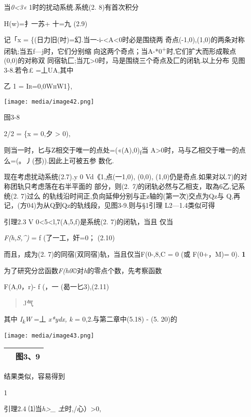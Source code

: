 \documentclass{article}
\begin{document}
当\emph{0\textless{}3«} 1时的扰动系统.系统(2. 8)有首次积分

H(w)=扌一苏+ 十=九 (2.9)

记「x = \{(日力旧(吋)=幻.当一-i-\textless{}A\textless{}0时必是围绕两
奇点(-1,0),(1,0)的两条对称闭轨;当五f---j时，它们分别缩
向这两个奇点；当A-*0\textsuperscript{+}时,它们扩大而形成鞍点(0,0)的对称双
同宿轨匚;当兀\textgreater{}0时，马是围绕三个奇点及匚的闭轨.以上分布
见图3-8.若令£ =丄UA,其中

乙 1 = \textsc{Ir=0,0WhW1\},}

\texttt{[image: media/image42.png]}

囹3-8

2/2 = \{\textbar{}x = 0,夕 \textgreater{} 0),

则当一时，匕与Z相交于唯一的点处=(«(A),0)\textsubscript{f}当
A\textgreater{}0时，马与乙相交于唯一的点么=(。丿(邳)).因此上可被五参
数化.

现在考虑扰动系统(2.7).y 0 Vd《1,点(一1,0), (0,0),
(1,0)仍是奇点.如果对以.7)的对称团轨只考虑落在右半平面的 部分，则(2.
\emph{7)}的闭轨必然与乙相支，取為6乙,记系统(2. 7)过么
的轨线沿时间正,负向延伸分别与正z轴的(第一次)交点为Qz与
Q,再记，(方04)为从Q到Qz的轨线段，见图3-9.则与§1引理 L2---1.4类似可得

引理2.3 V 0\textless{}5\textless{}l,7(A,5,f)是系统(2. 7)的闭轨，当且
仅当

\emph{F(h,S,\^{})} = f (了一工，奸=0； (2.10)

而且，成为(2. 7)的同宿(双同宿)轨，当且仅当F(0-,8,C = 0 (或 F(0+，M)= 0).
\textbf{1}

为了研究分岔函数\emph{F(h0©}对\emph{h}的零点个数，先考察函数

F(A,0，r)- f (，一 (曷一匕3),(2.11)

\begin{quote}
J气
\end{quote}

其中 \emph{I\textsubscript{k}W} =丄 \emph{x*ydx, k} =
0,2.与第二章中(5.18) - (5. 20)的

\texttt{[image: media/image43.png]}

\begin{longtable}[]{@{}ll@{}}
\toprule
\endhead
& 图3、9\tabularnewline
\bottomrule
\end{longtable}

结果类似，容易得到

1

引理2.4 ⑴当\emph{h\textgreater{}\_ 土}时,/心）\textgreater{}0,
\end{document}
